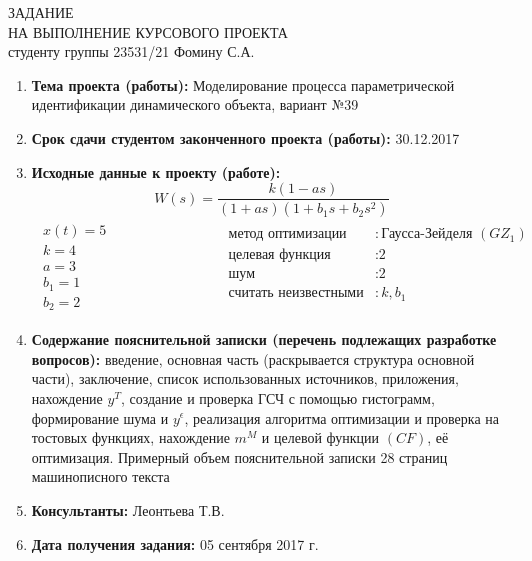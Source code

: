 \documentclass[a4paper, 12pt]{article}
\begin{document}
\newpage
\thispagestyle{empty}
\begin{center}
    ЗАДАНИЕ\\
    НА ВЫПОЛНЕНИЕ КУРСОВОГО ПРОЕКТА \\[1ex]
    студенту группы 23531/21 Фомину С.А.
\end{center}

\vspace{0.5cm}

\begin{enumerate}
    \item
        \textbf{Тема проекта (работы):} Моделирование процесса параметрической идентификации динамического объекта, вариант №39
    \item
        \textbf{Срок сдачи студентом законченного проекта (работы):} 30.12.2017
    \item
        \textbf{Исходные данные к проекту (работе):}
            $$W(s) = \frac{k(1-as)}{(1+as)(1+b_1s+b_2s^2)}$$
            $$
                \begin{matrix}
                    \begin{aligned}
                        x(t) = 5 \\
                        k = 4 \\
                        a = 3 \\
                        b_1 = 1 \\
                        b_2 = 2
                    \end{aligned}
                    &
                    \hspace{3cm}
                    \begin{aligned}
                        \text{метод оптимизации}&: \text{Гаусса-Зейделя $(GZ_1)$} \\
                        \text{целевая функция}&: \text{2} \\
                        \text{шум}&: \text{2} \\
                        \text{считать неизвестными}&: \text{$k, b_1$} \\
                    \end{aligned}
                \end{matrix}
            $$
    \item
        \textbf{Содержание пояснительной записки (перечень подлежащих разработке вопросов):} введение, основная часть (раскрывается структура основной части), заключение, список использованных источников, приложения, нахождение $y^T$, создание и проверка ГСЧ с помощью гистограмм, формирование шума и $y^\epsilon$, реализация алгоритма оптимизации и проверка на тостовых функциях, нахождение $m^M$ и целевой функции $(CF)$, её оптимизация. Примерный объем пояснительной записки 28 страниц машинописного текста
    \item
        \textbf{Консультанты:} Леонтьева Т.В.
    \item
        \textbf{Дата получения задания:} 05 сентября 2017 г.
\end{enumerate}
\end{document}

